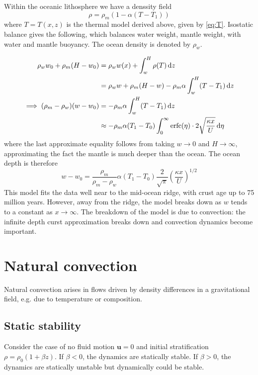 \documentclass{jknotes}
\begin{document}
Within the oceanic lithosphere we have a denssity field
\begin{equation}
	\rho = \rho_m \left( 1- \alpha (T - T_1)\right)
\end{equation}
where $T=T(x,z)$ is the thermal model derived above, given by \eqref{eq:T}.
Isostatic balance gives the following, which balances water weight, mantle
weight, with water and mantle buoyancy. The ocean density is denoted by
$\rho_w$.

\begin{align}
	\rho_w w_0 + \rho_m (H - w_0) &= \rho_w w(x) + \int_w^H \rho(T) \, \diffd
	z \\
	  &= \rho_w w + \rho_m (H-w) - \rho_m \alpha \int_w^H (T-T_1) \, \diffd z \\
	\implies (\rho_m - \rho_w)(w-w_0) &= - \rho_m \alpha \int_w^H (T-T_1) \,
	\diffd z \\
	&\approx  - \rho_m \alpha (T_1 - T_0) \int_0^\infty \text{erfc}(\eta)
	\cdot 2 \sqrt{\frac{\kappa x}{U}} \, \diffd \eta
\end{align}
where the last approximate equality follows from taking $w \to 0$ and $H \to
\infty$, approximating the fact the mantle is much deeper than the ocean. The
ocean depth is therefore
\begin{equation}
	w-w_0 = \frac{\rho_m}{\rho_m - \rho_w} \alpha (T_1-T_0)
	\frac{2}{\sqrt{\pi}} \left(\frac{\kappa x}{U}\right)^{1/2}
\end{equation}
This model fits the data well near to the mid-ocean ridge, with crust age up
to 75 million years. However, away from the ridge, the model breaks down as
$w$ tends to a constant as $x \to \infty$. The breakdown of the model is due
to convection: the infinite depth curst approximation breaks down and
convection dynamics become important.

\section{Natural convection}
Natural convection arises in flows driven by density differences in a
gravitational field, e.g. due to temperature or composition.

\subsection{Static stability}
Consider the case of no fluid motion $\symbf{u} = 0$ and initial
stratification $\rho = \rho_0 (1+\beta z)$.  If $\beta < 0$, the dynamics are
statically stable. If $\beta > 0$, the dynamics are statically unstable but
dynamically could be stable. 
\end{document}
